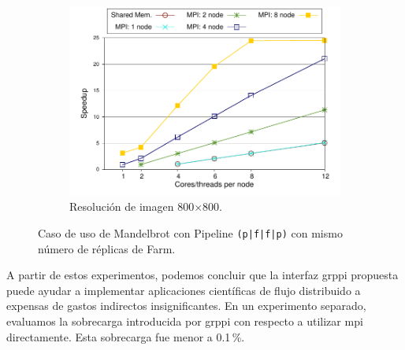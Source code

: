 \begin{figure}[!tbp]
\begin{subfigure}[b]{0.32\textwidth}
  \includegraphics[width=0.95\linewidth]{figures/graph-mpi-800-pffp.pdf}
  \caption{Resolución de imagen 800$\times$800.}
  \label{fig:mandel-pffp-800}
\end{subfigure}
\caption{Caso de uso de Mandelbrot con Pipeline \texttt{(p|f|f|p)} con mismo número de réplicas de Farm.}
\label{fig:mandel-pffp}
\end{figure}
\vspace{0.35cm}

A partir de estos experimentos, podemos concluir que la interfaz \acrshort{grppi} propuesta puede ayudar a implementar aplicaciones científicas de flujo distribuido a expensas de gastos indirectos insignificantes. En un experimento separado, evaluamos la sobrecarga introducida por \acrshort{grppi} con respecto a utilizar \acrshort{mpi} directamente. Esta sobrecarga fue menor a 0.1\,\%.

